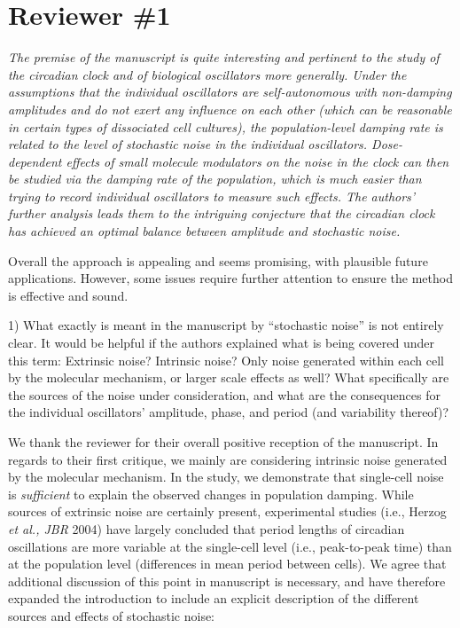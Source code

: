 \documentclass[11pt, letterpaper]{article}
\newenvironment{reviewer}{\itshape\color{gray}}{}
\begin{document}
\section*{Reviewer \#1}
\begin{reviewer}
The premise of the manuscript is quite interesting and pertinent to the study of the circadian clock and of biological oscillators more generally. 
Under the assumptions that the individual oscillators are self-autonomous with non-damping amplitudes and do not exert any influence on each other (which can be reasonable in certain types of dissociated cell cultures), the population-level damping rate is related to the level of stochastic noise in the individual oscillators. 
Dose-dependent effects of small molecule modulators on the noise in the clock can then be studied via the damping rate of the population, which is much easier than trying to record individual oscillators to measure such effects. 
The authors' further analysis leads them to the intriguing conjecture that the circadian clock has achieved an optimal balance between amplitude and stochastic noise.

Overall the approach is appealing and seems promising, with plausible future applications. However, some issues require further attention to ensure the method is effective and sound.

1) What exactly is meant in the manuscript by ``stochastic noise'' is not entirely clear. It would be helpful if the authors explained what is being covered under this term: Extrinsic noise? Intrinsic noise? Only noise generated within each cell by the molecular mechanism, or larger scale effects as well? What specifically are the sources of the noise under consideration, and what are the consequences for the individual oscillators' amplitude, phase, and period (and variability thereof)?
\end{reviewer}

We thank the reviewer for their overall positive reception of the manuscript. 
In regards to their first critique, we mainly are considering intrinsic noise generated by the molecular mechanism.
In the study, we demonstrate that single-cell noise is {\itshape sufficient} to explain the observed changes in population damping.
While sources of extrinsic noise are certainly present, experimental studies (i.e., Herzog {\itshape et al., JBR} 2004) have largely concluded that period lengths of circadian oscillations are more variable at the single-cell level (i.e., peak-to-peak time) than at the population level (differences in mean period between cells).
We agree that additional discussion of this point in manuscript is necessary, and have therefore expanded the introduction to include an explicit description of the different sources and effects of stochastic noise:
\end{document}
